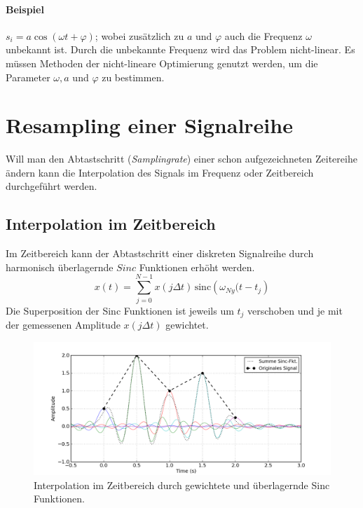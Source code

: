 \begin{enumerate}
\paragraph{Beispiel} $s_i=a \cos(\omega t + \varphi)$; wobei zusätzlich zu $a$ und $\varphi$ auch die Frequenz $\omega$ unbekannt ist. Durch die unbekannte Frequenz wird das Problem nicht-linear. Es müssen Methoden der nicht-lineare Optimierung genutzt werden, um die Parameter $\omega, a$ und $\varphi$ zu bestimmen.
\end{enumerate}

\section{Resampling einer Signalreihe}
Will man den Abtastschritt (\textsl{Samplingrate}) einer schon aufgezeichneten Zeitereihe ändern kann die Interpolation des Signals im Frequenz oder Zeitbereich durchgeführt werden.

\subsection{Interpolation im Zeitbereich}
Im Zeitbereich kann der Abtastschritt einer diskreten Signalreihe durch harmonisch überlagernde $Sinc$ Funktionen erhöht werden.
\begin{equation}
x(t) = \sum_{j=0}^{N-1} x(j \Delta t) \, \mbox{sinc} \left(\omega_{Ny}(t-{t_j}\right)
\end{equation}
Die Superposition der Sinc Funktionen ist jeweils um $t_j$ verschoben und je mit der gemessenen Amplitude $x(j\Delta t)$ gewichtet.

\begin{figure}[h!]
\centering
\includegraphics[width=.9\tw]{fig/04-Daten/interpolation_sinc.png}
\caption{Interpolation im Zeitbereich durch gewichtete und überlagernde Sinc Funktionen.}
\end{figure}

